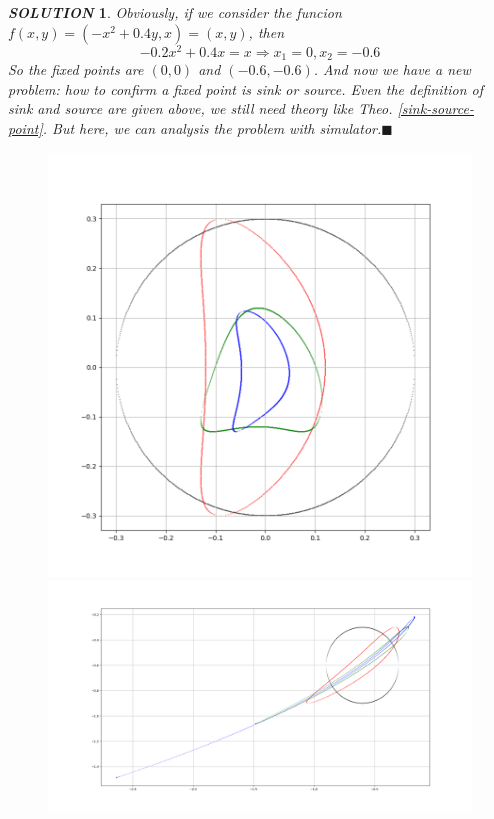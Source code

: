 \documentclass[12pt]{article}
\theoremstyle{plain}
\newtheorem{solution}{\textit{SOLUTION}}[section]
\begin{document}
{\color{blue}
\begin{solution} Obviously, if we consider the funcion $f(x, y) = (-x^2 + 0.4y, x) = (x, y)$, then 
$$
 -0.2x^2 +0.4x = x \Rightarrow x_1 = 0, x_2 = -0.6
$$
So the fixed points are $(0, 0)$ and $(-0.6, -0.6)$. And now we have a new problem: how to confirm a fixed point is sink or source. Even the definition of sink and source are given above, we still need theory like Theo. \ref{sink-source-point}. But here, we can analysis the problem with simulator.$\blacksquare$\\[2ex]

\begin{figure}[H]
\begin{minipage}[c][0.25\width]{0.25\textwidth}
   \centering
   \includegraphics[width=\textwidth]{figure/section2/Henon-0-0*4-sink.png}
\end{minipage}
\begin{minipage}[c][0.45\width]{0.45\textwidth}
   \centering
   \includegraphics[width=\textwidth]{figure/section2/Henon-0-0*4-source.png}

\end{minipage}
\end{figure}
\end{solution}}
\end{document}
